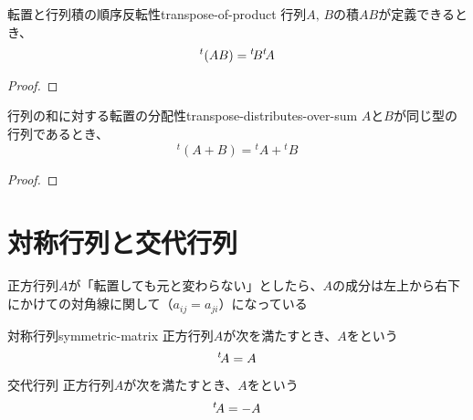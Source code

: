 \documentclass[../../../topic_linear-algebra]{subfiles}
\begin{document}
\sectionline

\begin{theorem}{転置と行列積の順序反転性}{transpose-of-product}
  行列$A,\,B$の積$AB$が定義できるとき、
  \begin{equation*}
    {}^t (AB) = {}^t\! B {}^t\! A
  \end{equation*}
\end{theorem}

\begin{proof}
\end{proof}

\sectionline

\begin{theorem}{行列の和に対する転置の分配性}{transpose-distributes-over-sum}
  $A$と$B$が同じ型の行列であるとき、
  \begin{equation*}
    {}^t(A + B) = {}^t A + {}^t B
  \end{equation*}
\end{theorem}

\begin{proof}
  \todo{}
\end{proof}

\sectionline
\section{対称行列と交代行列}

正方行列$A$が「転置しても元と変わらない」としたら、$A$の成分は左上から右下にかけての対角線に関して（$a_{ij} = a_{ji}$）になっている

\begin{definition}{対称行列}{symmetric-matrix}
  正方行列$A$が次を満たすとき、$A$をという
  \begin{equation*}
    {}^t\! A = A
  \end{equation*}
\end{definition}

\begin{definition*}{交代行列}
  正方行列$A$が次を満たすとき、$A$をという
  \begin{equation*}
    {}^t\! A = -A
  \end{equation*}
\end{definition*}
\end{document}
